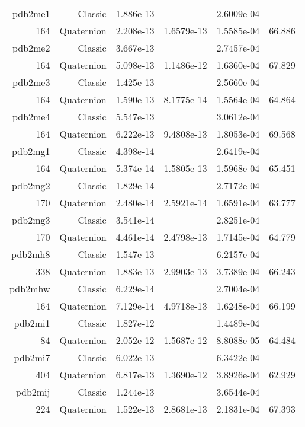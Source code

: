 \begin{xltabular}{\textwidth}{r|rS[table-format=1.3e+2]S[table-format=1.4e+2]S[table-format=1.4e+2]S[table-format=-1.3]}
pdb2me1 & Classic & 1.886e-13 &  & 2.6009e-04 & \\
164 & Quaternion & 2.208e-13 & 1.6579e-13 & 1.5585e-04 & 66.886\\  \addlinespace
pdb2me2 & Classic & 3.667e-13 &  & 2.7457e-04 & \\
164 & Quaternion & 5.098e-13 & 1.1486e-12 & 1.6360e-04 & 67.829\\  \addlinespace
pdb2me3 & Classic & 1.425e-13 &  & 2.5660e-04 & \\
164 & Quaternion & 1.590e-13 & 8.1775e-14 & 1.5564e-04 & 64.864\\  \addlinespace
pdb2me4 & Classic & 5.547e-13 &  & 3.0612e-04 & \\
164 & Quaternion & 6.222e-13 & 9.4808e-13 & 1.8053e-04 & 69.568\\  \addlinespace
pdb2mg1 & Classic & 4.398e-14 &  & 2.6419e-04 & \\
164 & Quaternion & 5.374e-14 & 1.5805e-13 & 1.5968e-04 & 65.451\\  \addlinespace
pdb2mg2 & Classic & 1.829e-14 &  & 2.7172e-04 & \\
170 & Quaternion & 2.480e-14 & 2.5921e-14 & 1.6591e-04 & 63.777\\  \addlinespace
pdb2mg3 & Classic & 3.541e-14 &  & 2.8251e-04 & \\
170 & Quaternion & 4.461e-14 & 2.4798e-13 & 1.7145e-04 & 64.779\\  \addlinespace
pdb2mh8 & Classic & 1.547e-13 &  & 6.2157e-04 & \\
338 & Quaternion & 1.883e-13 & 2.9903e-13 & 3.7389e-04 & 66.243\\  \addlinespace
pdb2mhw & Classic & 6.229e-14 &  & 2.7004e-04 & \\
164 & Quaternion & 7.129e-14 & 4.9718e-13 & 1.6248e-04 & 66.199\\  \addlinespace
pdb2mi1 & Classic & 1.827e-12 &  & 1.4489e-04 & \\
84 & Quaternion & 2.052e-12 & 1.5687e-12 & 8.8088e-05 & 64.484\\  \addlinespace
pdb2mi7 & Classic & 6.022e-13 &  & 6.3422e-04 & \\
404 & Quaternion & 6.817e-13 & 1.3690e-12 & 3.8926e-04 & 62.929\\  \addlinespace
pdb2mij & Classic & 1.244e-13 &  & 3.6544e-04 & \\
224 & Quaternion & 1.522e-13 & 2.8681e-13 & 2.1831e-04 & 67.393\\  \addlinespace

\end{xltabular}
